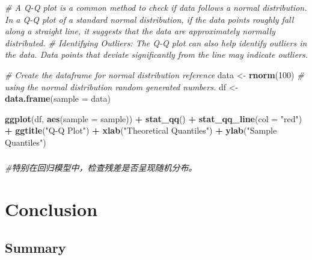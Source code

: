 \documentclass[
]{article}
\newenvironment{Shaded}{\begin{snugshade}}{\end{snugshade}}
\newcommand{\AttributeTok}[1]{\textcolor[rgb]{0.13,0.29,0.53}{#1}}
\newcommand{\CommentTok}[1]{\textcolor[rgb]{0.56,0.35,0.01}{\textit{#1}}}
\newcommand{\DecValTok}[1]{\textcolor[rgb]{0.00,0.00,0.81}{#1}}
\newcommand{\FunctionTok}[1]{\textcolor[rgb]{0.13,0.29,0.53}{\textbf{#1}}}
\newcommand{\NormalTok}[1]{#1}
\newcommand{\OtherTok}[1]{\textcolor[rgb]{0.56,0.35,0.01}{#1}}
\newcommand{\SpecialCharTok}[1]{\textcolor[rgb]{0.81,0.36,0.00}{\textbf{#1}}}
\newcommand{\StringTok}[1]{\textcolor[rgb]{0.31,0.60,0.02}{#1}}
\begin{document}
\begin{Shaded}
\begin{Highlighting}[]
\CommentTok{\#  A Q{-}Q plot is a common method to check if data follows a normal distribution. In a Q{-}Q plot of a standard normal distribution, if the data points roughly fall along a straight line, it suggests that the data are approximately normally distributed.}
\CommentTok{\# Identifying Outliers: The Q{-}Q plot can also help identify outliers in the data. Data points that deviate significantly from the line may indicate outliers.}

\CommentTok{\# Create the dataframe for normal distribution reference}
\NormalTok{data }\OtherTok{\textless{}{-}} \FunctionTok{rnorm}\NormalTok{(}\DecValTok{100}\NormalTok{) }\CommentTok{\# using the normal distribution random generated numbers.}
\NormalTok{df }\OtherTok{\textless{}{-}} \FunctionTok{data.frame}\NormalTok{(}\AttributeTok{sample =}\NormalTok{ data)}

\FunctionTok{ggplot}\NormalTok{(df, }\FunctionTok{aes}\NormalTok{(}\AttributeTok{sample =}\NormalTok{ sample)) }\SpecialCharTok{+}
  \FunctionTok{stat\_qq}\NormalTok{() }\SpecialCharTok{+}
  \FunctionTok{stat\_qq\_line}\NormalTok{(}\AttributeTok{col =} \StringTok{"red"}\NormalTok{) }\SpecialCharTok{+}
  \FunctionTok{ggtitle}\NormalTok{(}\StringTok{"Q{-}Q Plot"}\NormalTok{) }\SpecialCharTok{+}
  \FunctionTok{xlab}\NormalTok{(}\StringTok{"Theoretical Quantiles"}\NormalTok{) }\SpecialCharTok{+}
  \FunctionTok{ylab}\NormalTok{(}\StringTok{"Sample Quantiles"}\NormalTok{)}
\end{Highlighting}
\end{Shaded}

\hypertarget{section}{%
\subsubsection{}\label{section}}

\begin{Shaded}
\begin{Highlighting}[]
\CommentTok{\#特别在回归模型中，检查残差是否呈现随机分布。 }
\end{Highlighting}
\end{Shaded}

\hypertarget{conclusion}{%
\section{Conclusion}\label{conclusion}}

\hypertarget{summary}{%
\subsection{Summary}\label{summary}}
\end{document}
